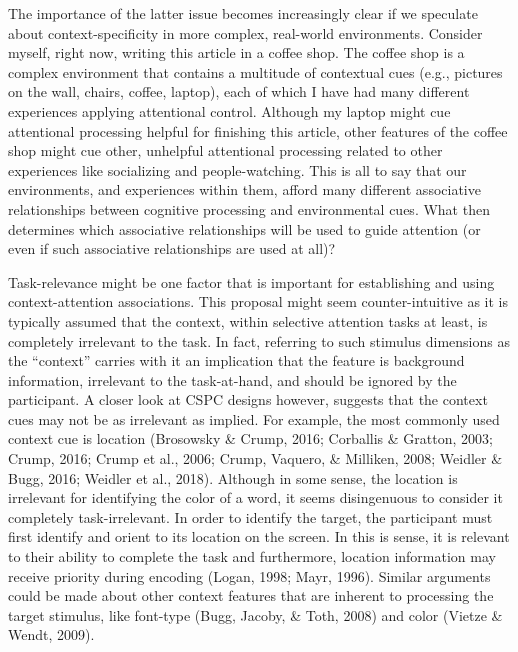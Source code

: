 \documentclass[english,,man,floatsintext]{apa6}
\begin{document}
The importance of the latter issue becomes increasingly clear if we speculate about context-specificity in more complex, real-world environments. Consider myself, right now, writing this article in a coffee shop. The coffee shop is a complex environment that contains a multitude of contextual cues (e.g., pictures on the wall, chairs, coffee, laptop), each of which I have had many different experiences applying attentional control. Although my laptop might cue attentional processing helpful for finishing this article, other features of the coffee shop might cue other, unhelpful attentional processing related to other experiences like socializing and people-watching. This is all to say that our environments, and experiences within them, afford many different associative relationships between cognitive processing and environmental cues. What then determines which associative relationships will be used to guide attention (or even if such associative relationships are used at all)?

Task-relevance might be one factor that is important for establishing and using context-attention associations. This proposal might seem counter-intuitive as it is typically assumed that the context, within selective attention tasks at least, is completely irrelevant to the task. In fact, referring to such stimulus dimensions as the \enquote{context} carries with it an implication that the feature is background information, irrelevant to the task-at-hand, and should be ignored by the participant. A closer look at CSPC designs however, suggests that the context cues may not be as irrelevant as implied. For example, the most commonly used context cue is location (Brosowsky \& Crump, 2016; Corballis \& Gratton, 2003; Crump, 2016; Crump et al., 2006; Crump, Vaquero, \& Milliken, 2008; Weidler \& Bugg, 2016; Weidler et al., 2018). Although in some sense, the location is irrelevant for identifying the color of a word, it seems disingenuous to consider it completely task-irrelevant. In order to identify the target, the participant must first identify and orient to its location on the screen. In this is sense, it is relevant to their ability to complete the task and furthermore, location information may receive priority during encoding (Logan, 1998; Mayr, 1996). Similar arguments could be made about other context features that are inherent to processing the target stimulus, like font-type (Bugg, Jacoby, \& Toth, 2008) and color (Vietze \& Wendt, 2009).
\end{document}
